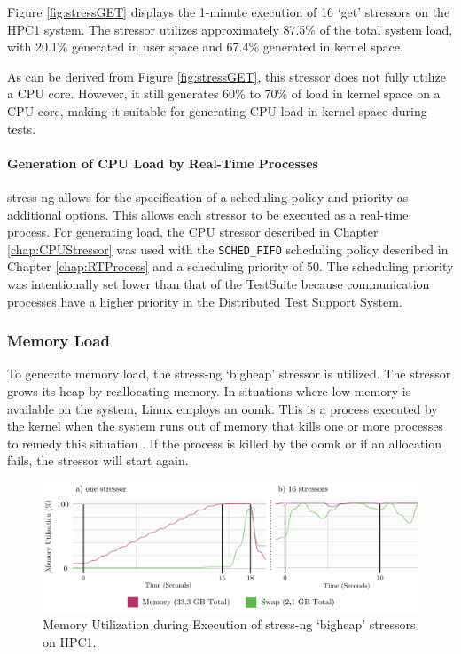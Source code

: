 Figure \ref{fig:stressGET} displays the 1-minute execution of 16 `get' stressors on the HPC1 system. The stressor utilizes approximately 87.5\% of the total system load, with 20.1\% generated in user space and 67.4\% generated in kernel space.

As can be derived from Figure \ref{fig:stressGET}, this stressor does not fully utilize a \ac{CPU} core. However, it still generates 60\% to 70\% of load in kernel space on a \ac{CPU} core, making it suitable for generating \ac{CPU} load in kernel space during tests.

\paragraph{Generation of CPU Load by Real-Time Processes}

stress-ng allows for the specification of a scheduling policy and priority as additional options. This allows each stressor to be executed as a real-time process. For generating load, the \ac{CPU} stressor described in Chapter \ref{chap:CPUStressor} was used with the \texttt{SCHED\_FIFO} scheduling policy described in Chapter \ref{chap:RTProcess} and a scheduling priority of 50. The scheduling priority was intentionally set lower than that of the TestSuite because communication processes have a higher priority in the Distributed Test Support System.

\subsubsection{Memory Load} \label{chap:stressngMemeory}
To generate memory load, the stress-ng `bigheap' stressor is utilized. The stressor grows its heap by reallocating memory. In situations where low memory is available on the system, Linux employs an \ac{oomk}. This is a process executed by the kernel when the system runs out of memory that kills one or more processes to remedy this situation \cite{stress09}. If the process is killed by the \ac{oomk} or if an allocation fails, the stressor will start again.

\begin{figure}[h!]
    \centering
    \includegraphics[width=1\linewidth]{figures/method/stress3.pdf}
    \caption{Memory Utilization during Execution of stress-ng `bigheap' stressors on HPC1.}
    \label{fig:stressMEM}
\end{figure}

